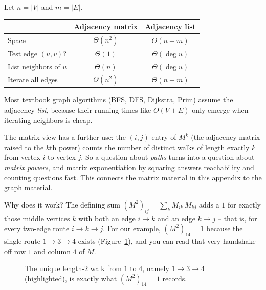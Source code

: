 \begin{complexitybox}
Let $n = \lvert V \rvert$ and $m = \lvert E \rvert$.
\begin{center}
\begin{tabular}{lcc}
\toprule
 & \textbf{Adjacency matrix} & \textbf{Adjacency list} \\
\midrule
Space                       & $\Theta(n^2)$ & $\Theta(n + m)$ \\
Test edge $(u,v)$?          & $\Theta(1)$   & $\Theta(\deg u)$ \\
List neighbors of $u$       & $\Theta(n)$   & $\Theta(\deg u)$ \\
Iterate all edges           & $\Theta(n^2)$ & $\Theta(n + m)$ \\
\bottomrule
\end{tabular}
\end{center}
Most textbook graph algorithms (BFS, DFS, Dijkstra, Prim) assume the adjacency
\emph{list}, because their running times like $O(V + E)$ only emerge when iterating
neighbors is cheap.
\end{complexitybox}

\begin{aestheticbox}
The matrix view has a further use: the $(i,j)$ entry of $M^k$ (the adjacency
matrix raised to the $k$th power) counts the number of distinct walks of length
exactly $k$ from vertex $i$ to vertex $j$. So a question about \emph{paths} turns
into a question about \emph{matrix powers}, and matrix exponentiation by squaring
answers reachability and counting questions fast. This connects the matrix
material in this appendix to the graph material.

Why does it work? The defining sum $(M^2)_{ij} = \sum_{k} M_{ik}\,M_{kj}$ adds a
$1$ for exactly those middle vertices $k$ with both an edge $i \to k$ and an edge
$k \to j$ -- that is, for every two-edge route $i \to k \to j$. For our example,
$(M^2)_{14} = 1$ because the single route $1 \to 3 \to 4$ exists
(Figure~\ref{ch39:fig-walk}), and you can read that very handshake off row $1$ and
column $4$ of $M$.

\begin{figure}[H]
\begin{center}
\end{center}
\caption{The unique length-$2$ walk from $1$ to $4$, namely $1 \to 3 \to 4$
(highlighted), is exactly what $(M^2)_{14} = 1$ records.}
\label{ch39:fig-walk}
\end{figure}
\end{aestheticbox}

